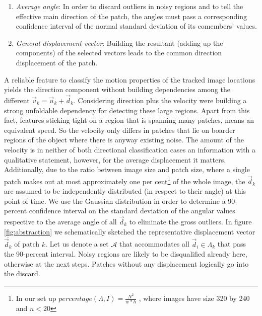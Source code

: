 \begin{enumerate}
	\item \textit{Average angle}: In order to discard outliers in noisy regions and to tell the effective main direction of the patch, the angles must pass a corresponding confidence interval of the normal standard deviation of its comembers' values.
	\item \textit{General displacement vector}: Building the resultant (adding up the components) of the selected vectors leads to the common direction displacement of the patch.
\end{enumerate}
%
A reliable feature to classify the motion properties of the tracked image locations yields the direction component without building dependencies among the different $ \vec{v}_k = \vec{u}_k + \vec{d}_k $. Considering direction plus the velocity were building a strong unfoldable dependency for detecting these large regions. Apart from this fact, features sticking tight on a region that is spanning many patches, means an equivalent speed. So the velocity only differs in patches that lie on boarder regions of the object where there is anyway existing noise. The amount of the velocity is in neither of both directional classification cases an information with a qualitative statement, however, for the average displacement it matters. Additionally, due to the ratio between image size and patch size, where a single patch makes out at most approximately one per cent\footnote{In our set up $ percentage \left(  \Lambda, I \right) = \frac{N^2}{w*h}$ , where images have size 320 by 240 and $n < 20$ } of the whole image, the $ \vec{d}_k $ are assumed to be independently distributed  (in respect to their angle) at this point of time. We use the Gaussian distribution in order to determine a 90-percent confidence interval on the standard deviation of the angular values respective to the average angle of all $\vec{d}_k $ to eliminate the gross outliers. In figure \ref{fig:abstraction} we schematically sketched the representative displacement vector $\overline{\vec{d}_k}$ of patch $k$. Let us denote a set $\mathcal{A}$ that accommodates all $\vec{d}_i \in \Lambda_k$ that pass the 90-percent interval.%
Noisy regions are likely to be disqualified already here, otherwise at the next steps. Patches without any displacement logically go into the discard. 
